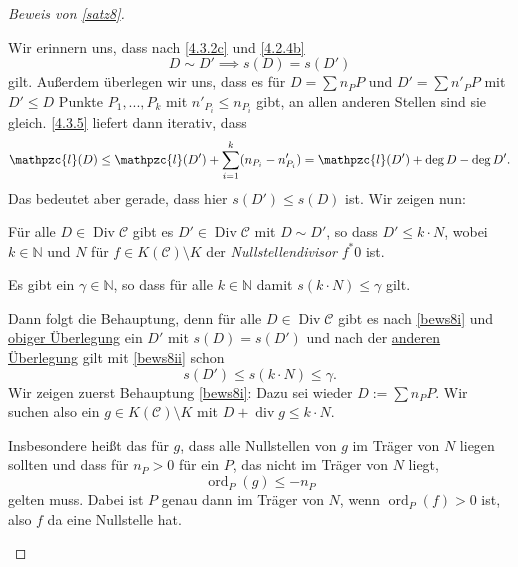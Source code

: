 \documentclass[a4paper,12pt,index=toc]{scrbook}
\theoremstyle{keinenummern} %
\def\CC{\mathcal{C}}
\def\ll{\mathpzc{l}}
\newcommand{\Div}{\operatorname{Div}}
\renewcommand{\div}{\operatorname{div}}
\newcommand{\ord}{\operatorname{ord}}
\renewcommand{\dotsc}{\ensuremath{\!...}}
\newcommand{\set}[1]{\ensuremath{\mathbb{#1}}}
\newcommand{\N}{\set{N}}
\begin{document}
\begin{proof}[Beweis von \cref{satz8}]
\begin{enumerate}
Wir erinnern uns, dass nach \cref{4.3.2c} und \cref{4.2.4b}
\hypertarget{bews8e1}{\begin{equation*}D\sim D'\implies s(D)=s(D')\end{equation*}}
gilt. Außerdem überlegen wir uns, dass es für $D=\sum n_{P}P$ und $D'=\sum n'_{P}P$ mit $D'\leq D$ Punkte $P_{1},\dotsc,P_{k}$ mit $n'_{P_{i}}\leq n_{P_{i}}$ gibt, an allen anderen Stellen sind sie gleich. \cref{4.3.5} liefert dann iterativ, dass 
\hypertarget{bews8e3}{\begin{equation*}\ll(D)\leq\ll(D')+\sum_{i=1}^{k}(n_{P_{i}}-n'_{P_{i}})=\ll(D')+\deg D-\deg D'.\end{equation*}}
Das bedeutet aber gerade, dass \hypertarget{bews8e2}{hier $s(D')\leq s(D)$ ist.} Wir zeigen nun:
\begin{prooflist}
\item\label{bews8i} Für alle $D\in\Div\CC$ gibt es $D'\in\Div\CC$ mit $D\sim D'$, so dass $D'\leq k\cdot N$, wobei $k\in\N$ und $N$ für $f\in K(\CC)\setminus K$ der \emph{Nullstellendivisor} $f^{*}0$ ist.
\item\label{bews8ii} Es gibt ein $\gamma\in\N$, so dass für alle $k\in\N$ damit $s(k\cdot N)\leq\gamma$ gilt.
\end{prooflist}
Dann folgt die Behauptung, denn für alle $D\in\Div\CC$ gibt es nach \ref{bews8i} und \hyperlink{bews8e1}{obiger Überlegung} ein $D'$ mit $s(D)=s(D')$ und nach der \hyperlink{bews8e2}{anderen Überlegung} gilt mit \ref{bews8ii} schon
\begin{equation*}s(D')\leq s(k\cdot N)\leq\gamma.\end{equation*}
Wir zeigen zuerst Behauptung \ref{bews8i}: Dazu sei wieder $D:=\sum n_{P}P$. Wir suchen also ein $g\in K(\CC)\setminus K$ mit $D+\div g\leq k\cdot N$.

Insbesondere heißt das für $g$, dass alle Nullstellen von $g$ im Träger von $N$ liegen sollten und dass für $n_{P}>0$ für ein $P$, das nicht im Träger von $N$ liegt, \begin{equation*}\ord_{P}(g)\leq-n_{P}\end{equation*} gelten muss. Dabei ist $P$ genau dann im Träger von $N$, wenn $\ord_{P}(f)>0$ ist, also $f$ da eine Nullstelle hat.


\end{enumerate}
\end{proof}
\end{document}
